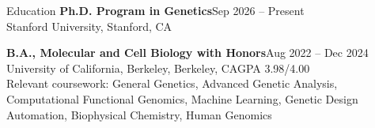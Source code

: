 \documentclass[letterpaper]{cv} %
\begin{document}
%
%
%
%
%
%
%


\begin{rSection}{Education}
\textbf{Ph.D. Program in Genetics}\notionsep Sep 2026 -- Present\\
Stanford University, Stanford, CA

\textbf{B.A., Molecular and Cell Biology with Honors}\notionsep Aug 2022 -- Dec 2024\\
University of California, Berkeley, Berkeley, CA\notionsep GPA 3.98/4.00\\
{\color{notiongray}Relevant coursework: General Genetics, Advanced Genetic Analysis, Computational Functional Genomics, Machine Learning, Genetic Design Automation, Biophysical Chemistry, Human Genomics}
\end{rSection}
\end{document}
